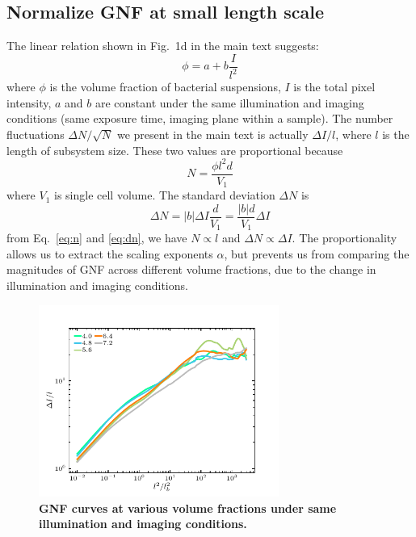 \documentclass[preprint,aps,prl,amsmath,amssymb,longbibliography]{revtex4-2}
\begin{document}
\subsection{Normalize GNF at small length scale}
\label{sec:normalize}
The linear relation shown in Fig.~1d in the main text suggests:
\begin{equation}
  \phi = a + b\frac{I}{l^2}
\end{equation}
where $\phi$ is the volume fraction of bacterial suspensions, $I$ is the total pixel intensity, $a$ and $b$ are constant under the same illumination and imaging conditions (same exposure time, imaging plane within a sample). The number fluctuations $\Delta N/\sqrt N$ we present in the main text is actually $\Delta I/l$, where $l$ is the length of subsystem size. These two values are proportional because
\begin{equation}
  \label{eq:n}
  N = \frac{\phi l^2d}{V_1}
\end{equation}
where $V_1$ is single cell volume. The standard deviation $\Delta N$ is
\begin{equation}
  \label{eq:dn}
  \Delta N = |b|\Delta I\frac{d}{V_1} = \frac{|b|d}{V_1}\Delta I
\end{equation}
from Eq.~\ref{eq:n} and \ref{eq:dn}, we have $N \propto l$ and $\Delta N \propto \Delta I$. The proportionality allows us to extract the scaling exponents $\alpha$, but prevents us from comparing the magnitudes of GNF across different volume fractions, due to the change in illumination and imaging conditions.

\begin{figure}[!]
\begin{center}
\includegraphics[width=0.7\textwidth]{Figures/GNF-normalization/same-illumination.pdf}
\caption[Density autocorrelation]
{
\textbf{GNF curves at various volume fractions under same illumination and imaging conditions.}
}
\label{fig:same-conditions}
\end{center}
\end{figure}
\end{document}
